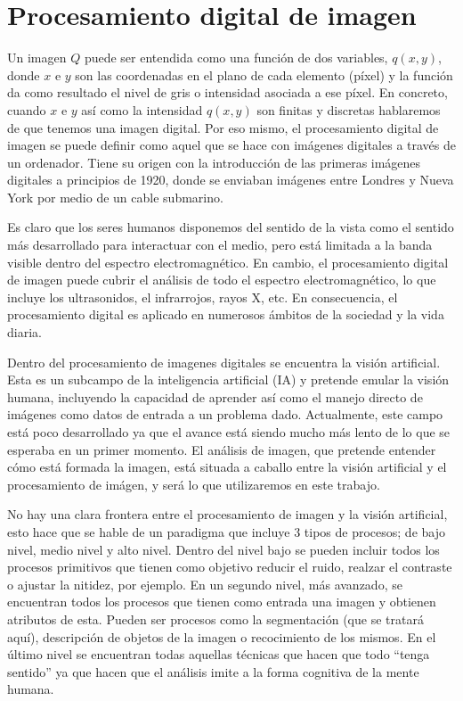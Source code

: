 \documentclass[main]{subfiles}
\begin{document}
\section{Procesamiento digital de imagen}\label{sec:procesamiento}

Un imagen $Q$ puede ser entendida como una función de dos variables, $q(x,y)$, donde $x$ e $y$ son las coordenadas en el plano de cada elemento (píxel) y la función da como resultado el nivel de gris o intensidad asociada a ese píxel. En concreto, cuando $x$ e $y$ así como la intensidad $q(x,y)$ son finitas y discretas hablaremos de que tenemos una imagen digital. Por eso mismo, el procesamiento digital de imagen se puede definir como aquel que se hace con imágenes digitales a través de un ordenador. Tiene su origen con la introducción de las primeras imágenes digitales a principios de 1920, donde se enviaban imágenes entre Londres y Nueva York por medio de un cable submarino.

Es claro que los seres humanos disponemos del sentido de la vista como el sentido más desarrollado para interactuar con el medio, pero está limitada a la banda visible dentro del espectro electromagnético. En cambio, el procesamiento digital de imagen puede cubrir el análisis de todo el espectro electromagnético, lo que incluye los ultrasonidos, el infrarrojos, rayos X, etc. En consecuencia, el procesamiento digital es aplicado en numerosos ámbitos de la sociedad y la vida diaria.

Dentro del procesamiento de imagenes digitales se encuentra la visión artificial. Esta es un subcampo de la inteligencia artificial (IA) y pretende emular la visión humana, incluyendo la capacidad de aprender así como el manejo directo de imágenes como datos de entrada a un problema dado. Actualmente, este campo está poco desarrollado \cite{lib:gonzalez} ya que el avance está siendo mucho más lento de lo que se esperaba en un primer momento. El análisis de imagen, que pretende entender cómo está formada la imagen, está situada a caballo entre la visión artificial y el procesamiento de imágen, y será lo que utilizaremos en este trabajo.

No hay una clara frontera entre el procesamiento de imagen y la visión artificial, esto hace que se hable de un paradigma que incluye 3 tipos de procesos; de bajo nivel, medio nivel y alto nivel. Dentro del nivel bajo se pueden incluir todos los procesos primitivos que tienen como objetivo reducir el ruido, realzar el contraste o ajustar la nitidez, por ejemplo. En un segundo nivel, más avanzado, se encuentran todos los procesos que tienen como entrada una imagen y obtienen atributos de esta. Pueden ser procesos como la segmentación (que se tratará aquí), descripción de objetos de la imagen o recocimiento de los mismos. En el último nivel se encuentran todas aquellas técnicas que hacen que todo ``tenga sentido'' ya que hacen que el análisis imite a la forma cognitiva de la mente humana.
\end{document}
